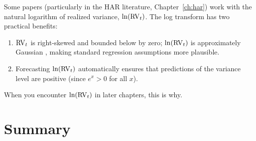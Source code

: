 Some papers (particularly in the HAR literature, Chapter~\ref{ch:har}) work with the natural logarithm of realized variance, $\ln(\operatorname{RV}_t)$.
The log transform has two practical benefits:
\begin{enumerate}[nosep]
  \item $\operatorname{RV}_t$ is right-skewed and bounded below by zero; $\ln(\operatorname{RV}_t)$ is approximately Gaussian \citep{ABDL2001, ABDL2003}, making standard regression assumptions more plausible.
  \item Forecasting $\ln(\operatorname{RV}_t)$ automatically ensures that predictions of the variance level are positive (since $e^x > 0$ for all $x$).
\end{enumerate}
When you encounter $\ln(\operatorname{RV}_t)$ in later chapters, this is why.


\section*{Summary}

